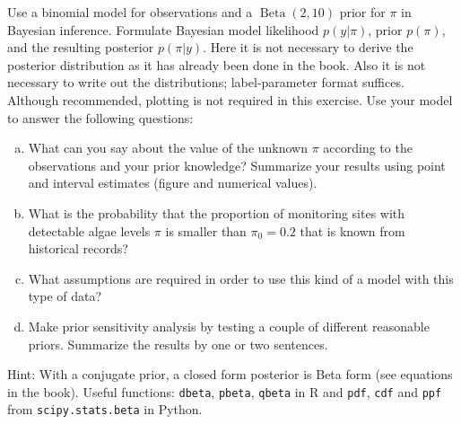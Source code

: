 \documentclass[a4paper,11pt]{article}
\DeclareMathOperator{\Beta}{Beta}
\begin{document}
Use a binomial model for observations and a $\Beta(2,10)$ prior
for $\pi$ in Bayesian inference. Formulate Bayesian model likelihood
$p(y|\pi)$, prior $p(\pi)$, and the resulting posterior $p(\pi|y)$.
Here it is not necessary to derive the posterior distribution as it has already been done in the book.
Also it is not necessary to write out the distributions; label-parameter format suffices. Although recommended, plotting is not required in this exercise.
Use your model to answer the following questions:
\begin{enumerate}[a)]
\item What can you say about the value of the unknown $\pi$ according
  to the observations and your prior knowledge? Summarize your results
  using point and interval estimates (figure and numerical values).
\item What is the probability that the proportion of monitoring sites with detectable algae levels $\pi$ is smaller than $\pi_0=0.2$ that is known from historical records?
\item What assumptions are required in order to use this kind of a
  model with this type of data?
\item Make prior sensitivity analysis by testing a couple of different reasonable priors. Summarize the results by one or two sentences.
\end{enumerate}
Hint: With a conjugate prior, a closed form posterior is Beta form (see
equations in the book). Useful functions: {\tt dbeta}, {\tt pbeta}, {\tt qbeta} in R and {\tt pdf}, {\tt cdf} and {\tt ppf} from {\tt scipy.stats.beta} in Python.
\end{document}
